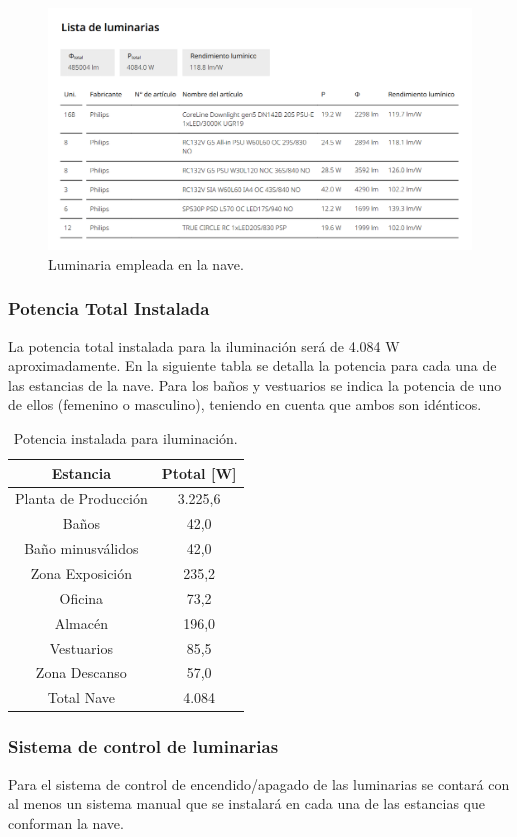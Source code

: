 \documentclass[../main.tex]{subfiles}
\begin{document}
\begin{figure}[H]
    \centering
    \includegraphics[width=0.75\linewidth]{Imagenes/Lista de luminarias.png}
    \caption{Luminaria empleada en la nave.}
\end{figure}

\subsubsection{Potencia Total Instalada}
La potencia total instalada para la iluminación será de 4.084 W aproximadamente. En la siguiente tabla se detalla la potencia para cada una de las estancias de la nave. Para los baños y vestuarios se indica la potencia de uno de ellos (femenino o masculino), teniendo en cuenta que ambos son idénticos.

\begin{table}[H]
    \centering
    \begin{tabular}{c | c }
         Estancia & Ptotal [W] \\ \hline
         Planta de Producción & 3.225,6 \\ 
         Baños & 42,0 \\ 
         Baño minusválidos & 42,0 \\ 
         Zona Exposición & 235,2 \\ 
         Oficina & 73,2 \\ 
         Almacén & 196,0 \\ 
         Vestuarios & 85,5 \\ 
         Zona Descanso & 57,0 \\ 
         Total Nave & 4.084
    \end{tabular}
    \caption{Potencia instalada para iluminación.}
\end{table}


\subsubsection{Sistema de control de luminarias}
Para el sistema de control de encendido/apagado de las luminarias se contará con al menos un sistema manual que se instalará en cada una de las estancias que conforman la nave.
\end{document}
